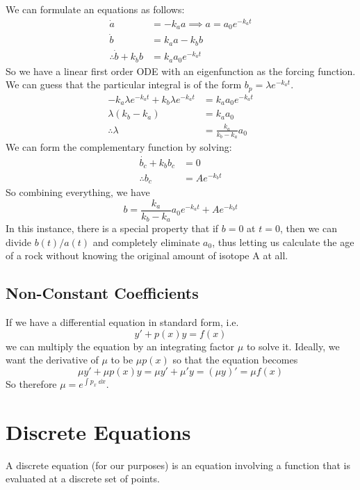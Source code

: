 \documentclass{article}
\begin{document}
\noindent We can formulate an equations as follows:
\begin{align*}
	\dot a                    & = -k_a a \implies a = a_0 e^{-k_a t} \\
	\dot b                    & = k_a a - k_b b                      \\
	\therefore \dot b + k_b b & = k_a a_0 e^{-k_a t}
\end{align*}
\noindent So we have a linear first order ODE with an eigenfunction as the forcing function. We can guess that the particular integral is of the form $b_p = \lambda e^{-k_a t}$.
\begin{align*}
	-k_a\lambda e^{-k_a t} + k_b \lambda e^{-k_a t} & = k_a a_0 e^{-k_a t}        \\
	\lambda(k_b-k_a)                                & = k_a a_0                   \\
	\therefore \lambda                              & = \frac{k_a}{k_b - k_a} a_0
\end{align*}
We can form the complementary function by solving:
\begin{align*}
	\dot{b_c} + k_b b_c & = 0           \\
	\therefore b_c      & = Ae^{-k_b t}
\end{align*}
So combining everything, we have
\[ b = \frac{k_a}{k_b - k_a} a_0 e^{-k_a t} + Ae^{-k_b t} \]
In this instance, there is a special property that if $b=0$ at $t=0$, then we can divide $b(t)/a(t)$ and completely eliminate $a_0$, thus letting us calculate the age of a rock without knowing the original amount of isotope A at all.

\subsection{Non-Constant Coefficients}
If we have a differential equation in standard form, i.e.
\[ y' + p(x)y = f(x) \]
we can multiply the equation by an integrating factor $\mu$ to solve it. Ideally, we want the derivative of $\mu$ to be $\mu p(x)$ so that the equation becomes
\[ \mu y' + \mu p(x) y = \mu y' + \mu' y = (\mu y)' = \mu f(x) \]
So therefore $\mu = e^{\int p_x\ \dd x}$.

\section{Discrete Equations}
A discrete equation (for our purposes) is an equation involving a function that is evaluated at a discrete set of points.
\end{document}
